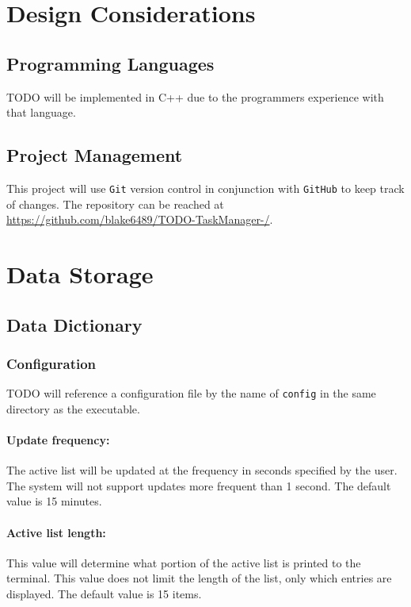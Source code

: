 \documentclass[12pt]{article}
\newcommand{\e}[1] {{\tt #1}}
\begin{document}
\section{Design Considerations}

\subsection{Programming Languages}
TODO will be implemented in C++ due to the programmers experience with that language.

\subsection{Project Management}
This project will use \e{Git} version control in conjunction with \e{GitHub} to keep track of changes. The repository can be reached at \url{https://github.com/blake6489/TODO-TaskManager-/}.

\section{Data Storage}\label{sec:Data Storage}
\subsection{Data Dictionary}\label{sec:Data Dictionary}
\subsubsection{Configuration} \label{sec:Configuration}
 TODO will reference a configuration file by the name of \e{config} in the same directory as the executable.
\paragraph{Update frequency:} \label{sec:Update timing} The active list will be updated at the frequency in seconds specified by the user. The system will not support updates more frequent than 1 second. The default value is 15 minutes.
\paragraph{Active list length:} \label{sec:Active list length} This value will determine what portion of the active list is printed to the terminal. This value does not limit the length of the list, only which entries are displayed. The default value is 15 items.
\end{document}
